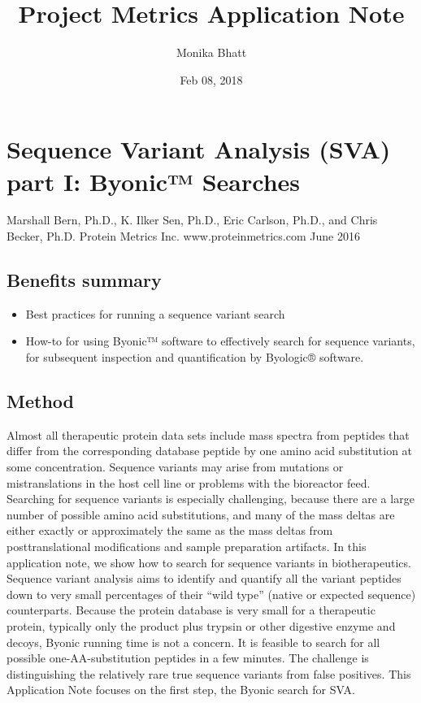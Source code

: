 \documentclass[letterpaper,10pt,oneside,english]{sphinxmanual}
\title{Project Metrics Application Note}
\date{Feb 08, 2018}
\author{Monika Bhatt}
\begin{document}
\maketitle
\sphinxtableofcontents
{}\label{\detokenize{index::doc}}



\chapter{Sequence Variant Analysis (SVA) part I: Byonic™ Searches}
\label{\detokenize{applicationnote:welcome-to-protein-metrics-s-documentation}}\label{\detokenize{applicationnote::doc}}\label{\detokenize{applicationnote:sequence-variant-analysis-sva-part-i-byonic-searches}}
Marshall Bern, Ph.D., K. Ilker Sen, Ph.D., Eric Carlson, Ph.D., and Chris Becker, Ph.D.
Protein Metrics Inc. www.proteinmetrics.com
June 2016


\section{Benefits summary}
\label{\detokenize{applicationnote:benefits-summary}}\begin{itemize}
\item {} 
Best practices for running a sequence variant search

\item {} 
How-to for using Byonic™ software to effectively search for sequence variants, for subsequent inspection and quantification by Byologic® software.

\end{itemize}


\section{Method}
\label{\detokenize{applicationnote:method}}
Almost all therapeutic protein data sets include mass spectra from peptides that differ from the corresponding database peptide by one amino acid substitution at some concentration.  Sequence variants may arise from mutations or mistranslations in the host cell line or problems with the bioreactor feed.  Searching for sequence variants is especially challenging, because there are a large number of possible amino acid substitutions, and many of the mass deltas are either exactly or approximately the same as the mass deltas from posttranslational modifications and sample preparation artifacts.  In this application note, we show how to search for sequence variants in biotherapeutics.
Sequence variant analysis aims to identify and quantify all the variant peptides down to very small percentages of their “wild type” (native or expected sequence) counterparts.  Because the protein database is very small for a therapeutic protein, typically only the product plus trypsin or other digestive enzyme and decoys, Byonic running time is not a concern. It is feasible to search for all possible one-AA-substitution peptides in a few minutes.  The challenge is distinguishing the relatively rare true sequence variants from false positives.
This Application Note focuses on the first step, the Byonic search for SVA.
\end{document}
